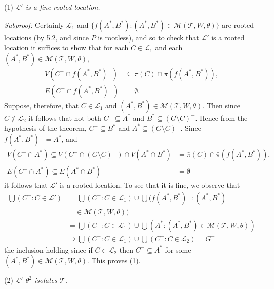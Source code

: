 \hspace*{12pt}(1) \textit{$\mathcal{L}'$ is a fine rooted location.}

\textit{Subproof:} Certainly $\mathcal{L}_1$ and $\{f(A^*, B^*) : (A^*, B^*) \in \mathcal{M}(\mathcal{T}, W, \theta)\}$ are rooted locations (by 5.2, and since $P$ is rootless), and so to check that $\mathcal{L}'$ is a rooted location it suffices to show that for each $C \in \mathcal{L}_1$ and each $(A^*, B^*) \in \mathcal{M}(\mathcal{T}, W, \theta)$,
\begin{align*}
V(C^- \cap f(A^*, B^*)^-) &\subseteq \bar{\pi}(C) \cap \bar{\pi}(f(A^*, B^*)), \\
E(C^- \cap f(A^*, B^*)^-) &= \emptyset.
\end{align*}
Suppose, therefore, that $C \in \mathcal{L}_1$ and $(A^*, B^*) \in \mathcal{M}(\mathcal{T}, W, \theta)$. Then since $C \notin \mathcal{L}_2$ it follows that not both $C^- \subseteq A^*$ and $B^* \subseteq (G \setminus C)^-$. Hence from the hypothesis of the theorem, $C^- \subseteq B^*$ and $A^* \subseteq (G \setminus C)^-$. Since $f(A^*, B^*)^- = A^*$, and
\begin{align*}
V(C^- \cap A^*) \subseteq V(C^- \cap (G \setminus C)^-) \cap V(A^* \cap B^*) &= \bar{\pi}(C) \cap \bar{\pi}(f(A^*, B^*)), \\
E(C^- \cap A^*) \subseteq E(A^* \cap B^*) &= \emptyset
\end{align*}
it follows that $\mathcal{L}'$ is a rooted location. To see that it is fine, we observe that
\begin{align*}
\bigcup (C^- : C \in \mathcal{L}') &= \bigcup (C^- : C \in \mathcal{L}_1) \cup \bigcup (f(A^*, B^*)^- : (A^*, B^*) \\
&\quad \in \mathcal{M}(\mathcal{T}, W, \theta)) \\
&= \bigcup (C^- : C \in \mathcal{L}_1) \cup \bigcup (A^* : (A^*, B^*) \in \mathcal{M}(\mathcal{T}, W, \theta)) \\
&\supseteq \bigcup (C^- : C \in \mathcal{L}_1) \cup \bigcup (C^- : C \in \mathcal{L}_2) = G^-
\end{align*}
the inclusion holding since if $C \in \mathcal{L}_2$ then $C^- \subseteq A^*$ for some $(A^*, B^*) \in \mathcal{M}(\mathcal{T}, W, \theta)$. This proves (1).

\hspace*{12pt}(2) \textit{$\mathcal{L}'$ $\theta^2$-isolates $\mathcal{T}$.}

